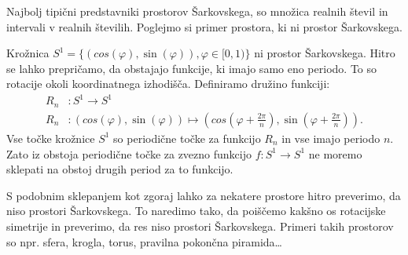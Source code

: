 \documentclass[mat2]{fmfdelo}
\begin{document}
Najbolj tipični predstavniki prostorov Šarkovskega, so množica realnih števil in intervali v realnih številih. Poglejmo si primer prostora, ki ni prostor Šarkovskega.

\begin{primer}
Krožnica $S^1 = \{ (cos(\varphi), \sin(\varphi)), \varphi \in [0, 1) \}$ ni prostor Šarkovskega. Hitro se lahko prepričamo, da obstajajo funkcije, ki imajo samo eno periodo. To so rotacije okoli koordinatnega izhodišča. Definiramo družino funkciji: 
\begin{equation*} %
\begin{split}
R_n &: S^1 \to S^1 \\ 
R_n &: (cos(\varphi), \sin(\varphi)) \mapsto (cos(\varphi + \frac{2 \pi}{n}), \sin(\varphi + \frac{2 \pi}{n})).
\end{split}
\end{equation*}
Vse točke krožnice $S^1$ so periodične točke za funkcijo $R_n$ in vse imajo periodo $n$. Zato iz obstoja periodične točke za zvezno funkcijo $f : S^1 \to S^1$ ne moremo sklepati na obstoj drugih period za to funkcijo.
\end{primer}
S podobnim sklepanjem kot zgoraj lahko za nekatere prostore hitro preverimo, da niso prostori Šarkovskega. To naredimo tako, da poiščemo kakšno os rotacijske simetrije in preverimo, da res niso prostori Šarkovskega. Primeri takih prostorov so npr. sfera, krogla, torus, pravilna pokončna piramida\dots 
\end{document}
